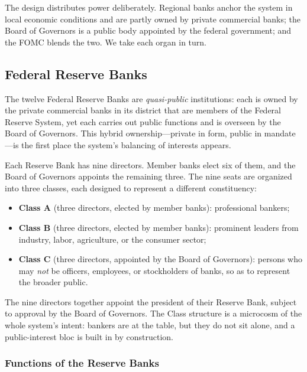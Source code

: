 The design distributes power deliberately. Regional banks anchor the system in local economic conditions and are partly owned by private commercial banks; the Board of Governors is a public body appointed by the federal government; and the FOMC blends the two. We take each organ in turn.

\subsection{Federal Reserve Banks}

The twelve Federal Reserve Banks are \emph{quasi-public} institutions: each is owned by the private commercial banks in its district that are members of the Federal Reserve System, yet each carries out public functions and is overseen by the Board of Governors. This hybrid ownership---private in form, public in mandate---is the first place the system's balancing of interests appears.

Each Reserve Bank has nine directors. Member banks elect six of them, and the Board of Governors appoints the remaining three. The nine seats are organized into three classes, each designed to represent a different constituency:
\begin{itemize}
    \item \textbf{Class A} (three directors, elected by member banks): professional bankers;
    \item \textbf{Class B} (three directors, elected by member banks): prominent leaders from industry, labor, agriculture, or the consumer sector;
    \item \textbf{Class C} (three directors, appointed by the Board of Governors): persons who may \emph{not} be officers, employees, or stockholders of banks, so as to represent the broader public.
\end{itemize}
The nine directors together appoint the president of their Reserve Bank, subject to approval by the Board of Governors. The Class structure is a microcosm of the whole system's intent: bankers are at the table, but they do not sit alone, and a public-interest bloc is built in by construction.

\subsubsection*{Functions of the Reserve Banks}

